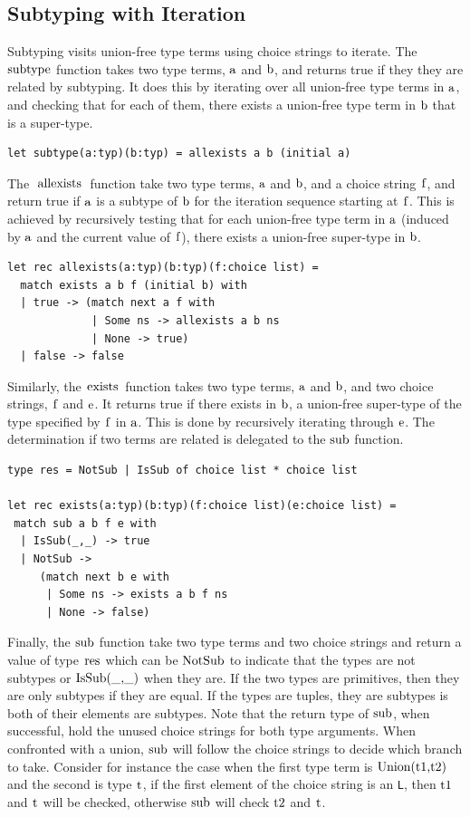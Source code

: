 \documentclass[a4paper,english]{lipics-v2019}
\renewcommand{\L}{{\tt L}\xspace}
\renewcommand{\c}[1]{\ensuremath{\text{\lstinline{#1}}}\xspace}
\begin{document}
\subsection{Subtyping with Iteration}

Subtyping visits union-free type terms using choice strings to iterate.  The
\c{subtype} function takes two type terms, \c a and \c b, and returns true
if they they are related by subtyping. It does this by iterating over all
union-free type terms in \c a, and checking that for each of them, there
exists a union-free type term in \c b that is a super-type.

\begin{lstlisting}
let subtype(a:typ)(b:typ) = allexists a b (initial a)
\end{lstlisting}

The \c{allexists} function take two type terms, \c a and \c b, and a choice
string \c f, and return true if \c a is a subtype of \c b for the iteration
sequence starting at \c f. This is achieved by recursively testing that for
each union-free type term in \c a (induced by \c a and the current value of
\c f), there exists a union-free super-type in \c b.

\begin{lstlisting}
let rec allexists(a:typ)(b:typ)(f:choice list) =
  match exists a b f (initial b) with 
  | true -> (match next a f with
             | Some ns -> allexists a b ns 
             | None -> true) 
  | false -> false
\end{lstlisting}

Similarly, the \c{exists} function takes two type terms, \c a and \c b, and
two choice strings, \c f and \c e. It returns true if there exists in \c b, a
union-free super-type of the type specified by \c f in \c a. This is done by
recursively iterating through \c e. The determination if two terms are
related is delegated to the \c{sub} function.

\begin{lstlisting}
type res = NotSub | IsSub of choice list * choice list

let rec exists(a:typ)(b:typ)(f:choice list)(e:choice list) =
 match sub a b f e with 
  | IsSub(_,_) -> true 
  | NotSub -> 
     (match next b e with
      | Some ns -> exists a b f ns 
      | None -> false) 
\end{lstlisting}

Finally, the \c{sub} function take two type terms and two choice strings and
return a value of type \c{res} which can be \c{NotSub} to indicate that the
types are not subtypes or \c{IsSub(_,_)} when they are.  If the two types
are primitives, then they are only subtypes if they are equal.  If the types
are tuples, they are subtypes is both of their elements are subtypes. Note
that the return type of \c{sub}, when successful, hold the unused choice
strings for both type arguments. When confronted with a union, \c{sub} will
follow the choice strings to decide which branch to take. Consider for
instance the case when the first type term is \c{Union(t1,t2)} and the
second is type \c{t}, if the first element of the choice string is an \L,
then \c{t1} and \c{t} will be checked, otherwise \c{sub} will check \c{t2}
and \c{t}.
\end{document}
